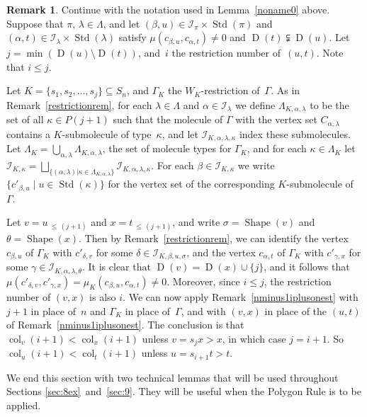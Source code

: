 \documentclass[10pt]{amsart}
\theoremstyle{definition}
\newtheorem{rema}[theo]{Remark}
\DeclareMathOperator{\col}{col}
\newcommand{\Lessthan}[2]{#1\,{_{\leqslant\,#2}}}
\DeclareMathOperator{\STD}{Std}
\DeclareMathOperator{\shape}{Shape}
\DeclareMathOperator{\D}{D}
\begin{document}
\begin{rema}\label{iplusonest}
Continue with the notation used in Lemma~\ref{noname0} above.
Suppose that $\pi,\,\lambda\in\Lambda$, and
let $(\beta,u)\in\mathcal{I}_{\pi}\times\STD(\pi)$ and
$(\alpha,t)\in\mathcal{I}_{\lambda}\times\STD(\lambda)$ satisfy
$\mu(c_{\beta,u},c_{\alpha,t}) \neq 0$ and $\D(t) \subsetneqq \D(u)$.
Let $j=\min(\D(u)\setminus\D(t))$, and~$i$ the restriction number of~$(u,t)$.
Note that $i\leqslant j$.

Let $K=\{s_1,s_2,\ldots,s_j\}\subseteq S_n$, and
$\Gamma_K$ the $W_K$-restriction of~$\Gamma$.
As in Remark~\ref{restrictionrem}, for each $\lambda\in\Lambda$
and $\alpha\in\mathcal{I}_\lambda$ we define $\Lambda_{K,\alpha,\lambda}$ to be the
set of all $\kappa\in P(j+1)$ such that the molecule of $\Gamma$ with the vertex set
$C_{\alpha,\lambda}$ contains a $K$-submolecule of type~$\kappa$,
and let $\mathcal{I}_{K,\alpha,\lambda,\kappa}$ index these
submolecules. Let $\Lambda_K=\bigcup_{\alpha,\lambda}\Lambda_{K,\alpha,\lambda}$, the
set of molecule types for $\Gamma_K$, and for each $\kappa\in\Lambda_K$ let
$\mathcal{I}_{K,\kappa}=\bigsqcup_{\{(\alpha,\lambda)|\kappa\in\Lambda_{K,\alpha,\lambda}\}}
\mathcal{I}_{K,\alpha,\lambda,\kappa}$. For each $\beta\in\mathcal{I}_{K,\kappa}$ we
write $\{c'_{\beta,u}\mid u\in\STD(\kappa)\}$ for the vertex set of the corresponding
$K$-submolecule of~$\Gamma$.

Let $v=\Lessthan u{(j+1)}$ and $x=\Lessthan t{(j+1)}$, and write $\sigma=\shape(v)$
and $\theta=\shape(x)$. Then by Remark~\ref{restrictionrem}, we can identify the vertex
$c_{\beta,u}$ of $\Gamma_K$ with $c'_{\delta,v}$ for some
$\delta\in\mathcal{I}_{K,\beta,u,\sigma}$, and
the vertex $c_{\alpha,t}$ of $\Gamma_K$ with $c'_{\gamma,x}$ for some
$\gamma\in\mathcal{I}_{K,\alpha,\lambda,\theta}$. It is clear that $\D(v)=\D(x)\cup\{j\}$,
and it follows that $\mu(c'_{\delta,v},c'_{\gamma,x})=\mu_K(c_{\beta,u},c_{\alpha,t})\neq 0$.
Moreover, since $i\leqslant j$, the restriction number of $(v,x)$ is also $i$. We can
now apply Remark~\ref{nminus1iplusonest} with $j+1$ in place of~$n$ and $\Gamma_K$ in
place of~$\Gamma$, and with $(v,x)$ in place of the $(u,t)$ of
Remark~\ref{nminus1iplusonest}. The conclusion is that $\col_v(i+1)<\col_x(i+1)$
unless $v=s_jx>x$, in which case $j=i+1$. So $\col_u(i+1)<\col_t(i+1)$ unless $u=s_{i+1}t>t$.
\end{rema}
We end this section with two technical lemmas that will be used throughout
Sections \ref{sec:8ex}~and~\ref{sec:9}. They will be useful when the Polygon Rule
is to be applied.
\end{document}
